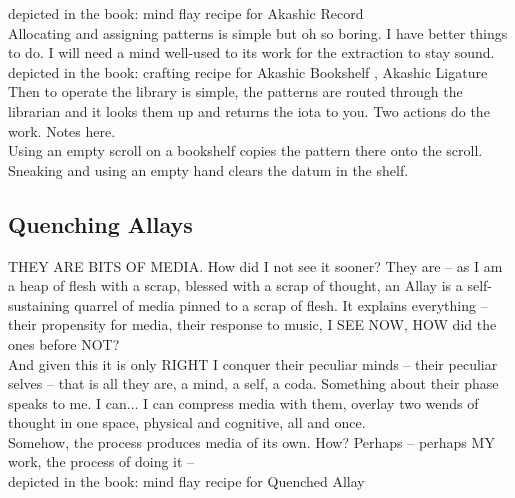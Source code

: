\documentclass[12pt]{article}
\begin{document}
    depicted in the book: mind flay recipe for Akashic Record\\
  
  Allocating and assigning patterns is simple but oh so boring. I have better things to do. I will need a mind well-used to its work for the extraction to stay sound.\\


  
  depicted in the book: crafting recipe for 
    Akashic Bookshelf
,     Akashic Ligature
\\

      



  
    Then to operate the library is simple, the patterns are routed through the librarian and it looks them up and returns the iota to you. Two actions do the work. Notes here.\\Using an empty scroll on a bookshelf copies the pattern there onto the scroll. Sneaking and using an empty hand clears the datum in the shelf.\\

\newpage

\label{sec:greatwork/quenching_allays}
\subsection*{Quenching Allays}


  
    THEY ARE BITS OF MEDIA. How did I not see it sooner? They are -- as I am a heap of flesh with a scrap, blessed with a scrap of thought, an Allay is a self-sustaining quarrel of media pinned to a scrap of flesh. It explains everything -- their propensity for media, their response to music, I SEE NOW, HOW did the ones before NOT?\\


  
    And given this it is only RIGHT I conquer their peculiar minds -- their peculiar selves -- that is all they are, a mind, a self, a coda. Something about their phase speaks to me. I can... I can compress media with them, overlay two wends of thought in one space, physical and cognitive, all and once.\\Somehow, the process produces media of its own. How? Perhaps -- perhaps MY work, the process of doing it --\\


    depicted in the book: mind flay recipe for Quenched Allay\\
  
\end{document}
